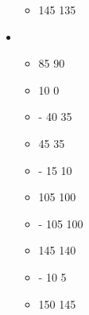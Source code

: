 \begin{multicols}{2}
\begin{itemize}
\begin{itemize}
  \item \steamcopters{} \extramodel{} 145 \costdown{} 135
	\end{itemize}
	  \item \enginesofwar
	\begin{itemize}
  \item \fieldartillery{} \basecost{} 85 \costup{} 90
  \item \fieldartillery{} \flamingshot{} 10 \costdown{} 0
  \item \fieldartillery{} \dwarfballista{} - \runecrafted{} 40 \costdown{} 35
  \item \fieldartillery{} \flamecannon{} 45 \costdown{} 35
  \item \fieldartillery{} \flamecannon{} - \runecrafted{} 15 \costdown{} 10
  \item \fieldartillery{} \dwarfcatapult{} 105 \costdown{} 100
  \item \fieldartillery{} \dwarfcatapult{} - \runecrafted{} 105 \costdown{} 100
  \item \fieldartillery{} \dwarfcannon{} 145 \costdown{} 140
  \item \fieldartillery{} \dwarfcannon{} - \runecrafted{} 10 \costdown{} 5
  \item \fieldartillery{} \organgun{} 150 \costdown{} 145
	\end{itemize}
\end{itemize}

\end{multicols}
